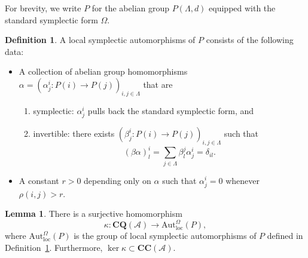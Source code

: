 \documentclass{article}
\theoremstyle{definition}
\newtheorem{defn}[theorem]{Definition}
\newtheorem{lem}[theorem]{Lemma}
\newcommand{\SA}{{\mathscr A}}
\def \al {\alpha}
\begin{document}
For brevity, we write $P$ for the abelian group $P(\Lambda,d)$ equipped with the standard symplectic form $\Omega$. 
\begin{defn} \label{defn: local symp}
A local symplectic automorphisms of $P$ consists of the following data:
\begin{itemize} 

\item A collection of abelian group homomorphisms $\al=(\alpha_j^i: P(i)\rightarrow P(j))_{i, j\in \Lambda}$ that are
    \begin{enumerate}
        \item symplectic: $\alpha^i_j$ pulls back the standard symplectic form, and
        \item invertible: there exists $(\beta_j^i: P(i)\rightarrow P(j))_{i, j\in \Lambda}$ such that
    $$(\beta \alpha)^i_l = \sum_{j \in \Lambda} \beta^j_l \alpha^i_j=\delta_{il}.$$
    
\end{enumerate}

\item A constant $r>0$ depending only on $\alpha$ such that $\alpha^i_j=0$ whenever $\rho(i,j)>r$.
\end{itemize}
\end{defn}
\begin{lem} \label{lem: motivation}
    There is a surjective homomorphism $$\kappa: \mathbf{CQ}(\SA)\rightarrow \mathrm{Aut}_{\mathrm{loc}}^{\Omega}(P),$$ where $\mathrm{Aut}_{\mathrm{loc}}^{\Omega}(P)$ is the group of local symplectic automorphisms of $P$ defined in Definition~\ref{defn: local symp}. Furthermore, $\ker \kappa\subset \mathbf{CC}(\SA)$. 
\end{lem}
\end{document}
